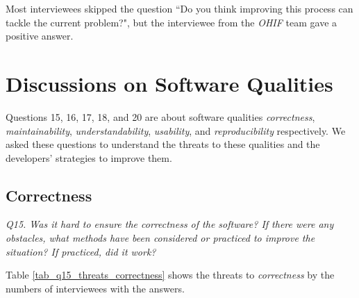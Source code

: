 Most interviewees skipped the question ``Do you think improving this process can tackle the current problem?", but the interviewee from the \textit{OHIF} team gave a positive answer.

\section{Discussions on Software Qualities}
\label{sec_interview_software_qualities}
Questions 15, 16, 17, 18, and 20 are about software qualities \textit{correctness}, \textit{maintainability}, \textit{understandability}, \textit{usability}, and \textit{reproducibility} respectively. We asked these questions to understand the threats to these qualities and the developers' strategies to improve them.

\subsection{Correctness}
\textit{Q15. Was it hard to ensure the correctness of the software? If there were any obstacles, what methods have been considered or practiced to improve the situation? If practiced, did it work?}

Table \ref{tab_q15_threats_correctness} shows the threats to \textit{correctness} by the numbers of interviewees with the answers.

